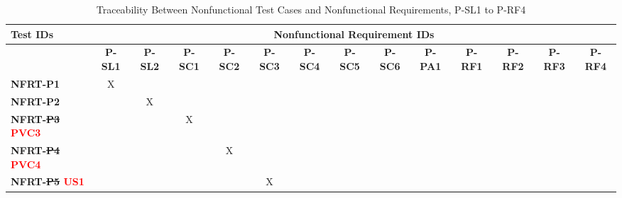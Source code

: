 \documentclass[12pt, titlepage]{article}
\begin{document}
\begin{landscape}
		\begin{longtable}{|l|ccccccccccccc|}
	\caption{Traceability Between Nonfunctional Test Cases and Nonfunctional Requirements, P-SL1 to P-RF4}                                                                                                                                                                                                                           \\
		\hline
		\textbf{Test IDs}   & \multicolumn{13}{c|}{\textbf{Nonfunctional Requirement IDs}}                                                                                                                                                                                                                 \\
		\hline
		~                   & \textbf{P-SL1}  & \textbf{P-SL2} & \textbf{P-SC1} & \textbf{P-SC2} & \textbf{P-SC3} & \textbf{P-SC4} & \textbf{P-SC5} & \textbf{P-SC6} & \textbf{P-PA1} & \textbf{P-RF1} & \textbf{P-RF2} & \textbf{P-RF3} & \textbf{P-RF4} \\
		\hline
		\textbf{NFRT-P1} & X                                                         & ~             & ~             & ~             & ~             & ~             & ~             & ~             & ~             & ~             & ~             & ~             & ~\\
		\textbf{NFRT-P2} & ~                                                         & X             & ~             & ~             & ~             & ~             & ~             & ~             & ~             & ~             & ~             & ~             & ~ \\
		\textbf{NFRT-\sout{P3} \textcolor{red}{PVC3}} & ~                                                         & ~             & X             & ~             & ~             & ~             & ~             & ~             & ~             & ~             & ~ & ~ & ~ \\
		\textbf{NFRT-\sout{P4} \textcolor{red}{PVC4}} & ~                                                         & ~             & ~             & X             & ~             & ~             & ~             & ~             & ~             & ~             & ~ & ~ & ~ \\
		\textbf{NFRT-\sout{P5} \textcolor{red}{US1}} & ~                                                         & ~             & ~             & ~             & X             & ~             & ~             & ~             & ~             & ~             & ~ & ~ & ~ \\

\end{longtable}
\end{landscape}
\end{document}
